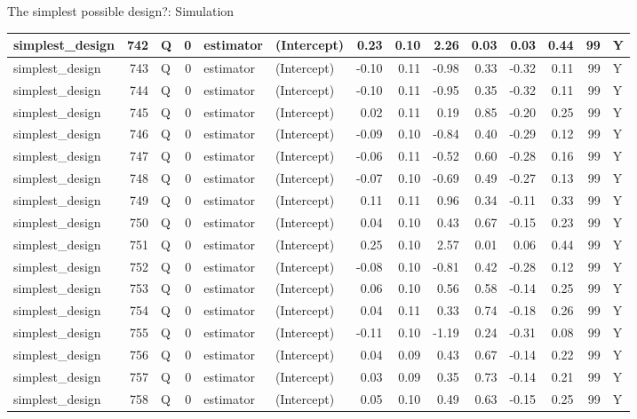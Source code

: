 \documentclass[
  11pt,
  ignorenonframetext,
]{beamer}
\begin{document}
\begin{frame}[fragile]{The simplest possible design?: Simulation}
\begin{tabular}{l|r|l|r|l|l|r|r|r|r|r|r|r|l}
\hline
simplest\_design & 742 & Q & 0 & estimator & (Intercept) & 0.23 & 0.10 & 2.26 & 0.03 & 0.03 & 0.44 & 99 & Y\\
\hline
simplest\_design & 743 & Q & 0 & estimator & (Intercept) & -0.10 & 0.11 & -0.98 & 0.33 & -0.32 & 0.11 & 99 & Y\\
\hline
simplest\_design & 744 & Q & 0 & estimator & (Intercept) & -0.10 & 0.11 & -0.95 & 0.35 & -0.32 & 0.11 & 99 & Y\\
\hline
simplest\_design & 745 & Q & 0 & estimator & (Intercept) & 0.02 & 0.11 & 0.19 & 0.85 & -0.20 & 0.25 & 99 & Y\\
\hline
simplest\_design & 746 & Q & 0 & estimator & (Intercept) & -0.09 & 0.10 & -0.84 & 0.40 & -0.29 & 0.12 & 99 & Y\\
\hline
simplest\_design & 747 & Q & 0 & estimator & (Intercept) & -0.06 & 0.11 & -0.52 & 0.60 & -0.28 & 0.16 & 99 & Y\\
\hline
simplest\_design & 748 & Q & 0 & estimator & (Intercept) & -0.07 & 0.10 & -0.69 & 0.49 & -0.27 & 0.13 & 99 & Y\\
\hline
simplest\_design & 749 & Q & 0 & estimator & (Intercept) & 0.11 & 0.11 & 0.96 & 0.34 & -0.11 & 0.33 & 99 & Y\\
\hline
simplest\_design & 750 & Q & 0 & estimator & (Intercept) & 0.04 & 0.10 & 0.43 & 0.67 & -0.15 & 0.23 & 99 & Y\\
\hline
simplest\_design & 751 & Q & 0 & estimator & (Intercept) & 0.25 & 0.10 & 2.57 & 0.01 & 0.06 & 0.44 & 99 & Y\\
\hline
simplest\_design & 752 & Q & 0 & estimator & (Intercept) & -0.08 & 0.10 & -0.81 & 0.42 & -0.28 & 0.12 & 99 & Y\\
\hline
simplest\_design & 753 & Q & 0 & estimator & (Intercept) & 0.06 & 0.10 & 0.56 & 0.58 & -0.14 & 0.25 & 99 & Y\\
\hline
simplest\_design & 754 & Q & 0 & estimator & (Intercept) & 0.04 & 0.11 & 0.33 & 0.74 & -0.18 & 0.26 & 99 & Y\\
\hline
simplest\_design & 755 & Q & 0 & estimator & (Intercept) & -0.11 & 0.10 & -1.19 & 0.24 & -0.31 & 0.08 & 99 & Y\\
\hline
simplest\_design & 756 & Q & 0 & estimator & (Intercept) & 0.04 & 0.09 & 0.43 & 0.67 & -0.14 & 0.22 & 99 & Y\\
\hline
simplest\_design & 757 & Q & 0 & estimator & (Intercept) & 0.03 & 0.09 & 0.35 & 0.73 & -0.14 & 0.21 & 99 & Y\\
\hline
simplest\_design & 758 & Q & 0 & estimator & (Intercept) & 0.05 & 0.10 & 0.49 & 0.63 & -0.15 & 0.25 & 99 & Y\\

\end{tabular}
\end{frame}
\end{document}
